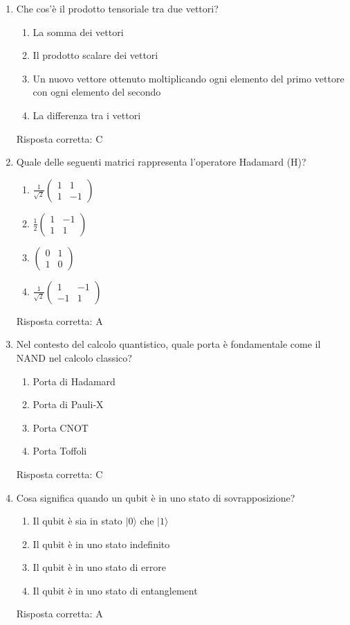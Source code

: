 \documentclass{article}
\begin{document}
\begin{enumerate}[label=\textbf{Domanda \arabic*.}]
\item Che cos'è il prodotto tensoriale tra due vettori?
\begin{enumerate}[label=\Alph*.]
    \item La somma dei vettori
    \item Il prodotto scalare dei vettori
    \item Un nuovo vettore ottenuto moltiplicando ogni elemento del primo vettore con ogni elemento del secondo
    \item La differenza tra i vettori
\end{enumerate}
Risposta corretta: C

\item Quale delle seguenti matrici rappresenta l'operatore Hadamard (H)?
\begin{enumerate}[label=\Alph*.]
    \item \(\frac{1}{\sqrt{2}} \begin{pmatrix} 1 & 1 \\ 1 & -1 \end{pmatrix}\)
    \item \(\frac{1}{2} \begin{pmatrix} 1 & -1 \\ 1 & 1 \end{pmatrix}\)
    \item \(\begin{pmatrix} 0 & 1 \\ 1 & 0 \end{pmatrix}\)
    \item \(\frac{1}{\sqrt{2}} \begin{pmatrix} 1 & -1 \\ -1 & 1 \end{pmatrix}\)
\end{enumerate}
Risposta corretta: A

\item Nel contesto del calcolo quantistico, quale porta è fondamentale come il NAND nel calcolo classico?
\begin{enumerate}[label=\Alph*.]
    \item Porta di Hadamard
    \item Porta di Pauli-X
    \item Porta CNOT
    \item Porta Toffoli
\end{enumerate}
Risposta corretta: C


\item Cosa significa quando un qubit è in uno stato di sovrapposizione?
\begin{enumerate}[label=\Alph*.]
    \item Il qubit è sia in stato \( |0\rangle \) che \( |1\rangle \)
    \item Il qubit è in uno stato indefinito
    \item Il qubit è in uno stato di errore
    \item Il qubit è in uno stato di entanglement
\end{enumerate}
Risposta corretta: A
\end{enumerate}
\end{document}
